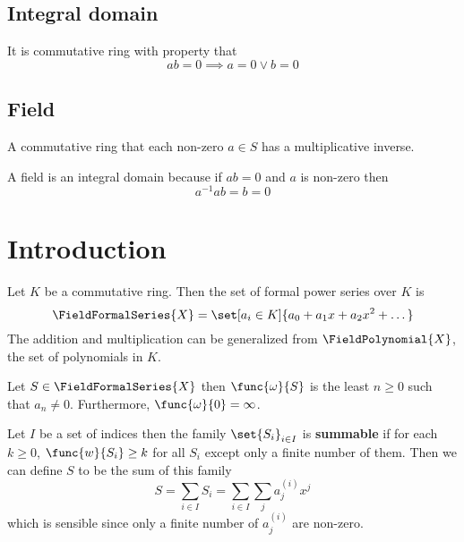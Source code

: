 \subsection*{Integral domain}
It is commutative ring with property that 
\begin{equation*}
    ab =  0 \implies a= 0  \lor b = 0
\end{equation*}

\subsection*{Field}
A commutative ring that each non-zero \(a \in S\) has a multiplicative inverse.

\begin{example}
    A field is an integral domain because if \(ab = 0\) and \(a\) is non-zero then 
    \begin{equation*} 
    a^{-1}ab = b = 0
    \end{equation*}
\end{example}
\section{Introduction}
Let \(K\) be a commutative ring. Then the set of formal power series over \(K\) is 
\begin{equation*}
    \FieldFormalSeries{X} = \set[a_i \in K]{a_0 + a_1x + a_2x^2 + \dots}
\end{equation*}
The addition and multiplication can be generalized from \(\FieldPolynomial{X}\), the set of polynomials in \(K\).
\begin{definition}[Order]
    Let \(S \in \FieldFormalSeries{X}\) then \(\func{\omega}{S}\) is the least \(n \geq 0\) such that \(a_n \neq 0\). Furthermore, \(\func{\omega}{0} = \infty\). 
\end{definition}

\begin{definition}[Summability]
    Let \(I\) be a set of indices then the family \(\set{S_i}_{i \in I}\) is \textbf{summable} if for each \(k \geq 0\), \(\func{w}{S_i} \geq k\) for all \(S_i\) except only a finite number of them. Then we can define \(S\) to be the sum of this family 
    \begin{equation*}
        S = \sum_{i \in I} S_i = \sum_{i \in I} \sum_{j} a^{(i)}_j x^j
    \end{equation*}
    which is sensible since only a finite number of \(a^{(i)}_j\) are non-zero.
\end{definition}


